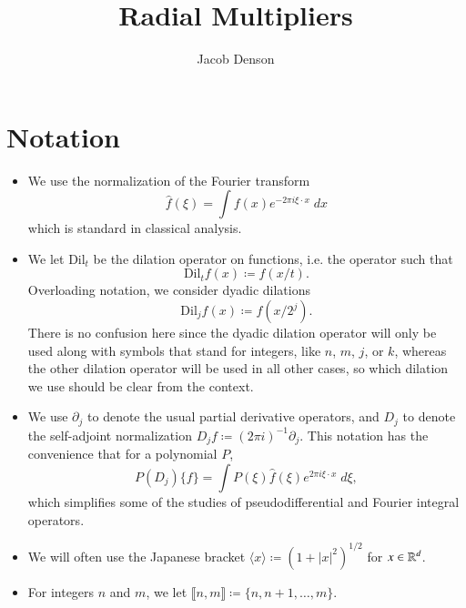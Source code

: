     

\title{Radial Multipliers}
\author{Jacob Denson}



\maketitle

\tableofcontents

\newpage

\chapter{Notation}

\begin{itemize}
    \item We use the normalization of the Fourier transform
    \[ \widehat{f}(\xi) = \int f(x) e^{- 2 \pi i \xi \cdot x}\; dx \]
    which is standard in classical analysis.

    \item We let $\text{Dil}_t$ be the dilation operator on functions, i.e. the operator such that
    \[ \text{Dil}_t f(x) \coloneqq f(x/t). \]
    Overloading notation, we consider dyadic dilations
    \[ \text{Dil}_j f(x) \coloneqq f(x/2^j). \]
    There is no confusion here since the dyadic dilation operator will only be used along with symbols that stand for integers, like $n$, $m$, $j$, or $k$, whereas the other dilation operator will be used in all other cases, so which dilation we use should be clear from the context.

    \item We use $\partial_j$ to denote the usual partial derivative operators, and $D_j$ to denote the self-adjoint normalization $D_j f \coloneqq (2 \pi i)^{-1} \partial_j$. This notation has the convenience that for a polynomial $P$,
    \[ P(D_j) \{ f \} = \int P(\xi) \widehat{f}(\xi) e^{2 \pi i \xi \cdot x}\; d\xi, \]
    which simplifies some of the studies of pseudodifferential and Fourier integral operators.

    \item We will often use the Japanese bracket $\langle x \rangle \coloneqq (1 + |x|^2)^{1/2}$ for $x \in \operatorname{\mathbb{R}}^d$.

    \item For integers $n$ and $m$, we let $\llbracket n,m \rrbracket \coloneqq \{ n, n+1, \dots, m \}$.
\end{itemize}

